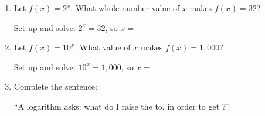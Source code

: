\documentclass[10pt]{article}
\begin{document}
\namedateperiod

\vspace{0.16in}

\begin{enumerate}[itemsep=22pt]

\item Let $f(x) = 2^x$. What whole-number value of $x$ makes $f(x) = 32$?

      Set up and solve: $2^x = 32$, so $x = $ \blank{2.5cm}

\item Let $f(x) = 10^x$. What value of $x$ makes $f(x) = 1{,}000$?

      Set up and solve: $10^x = 1{,}000$, so $x = $ \blank{2.5cm}

\item Complete the sentence:

      \medskip
      ``A logarithm asks: what \blank{2.5cm} do I raise the \blank{2.5cm} to,
      in order to get \blank{2.5cm}?''

\end{enumerate}
\end{document}
